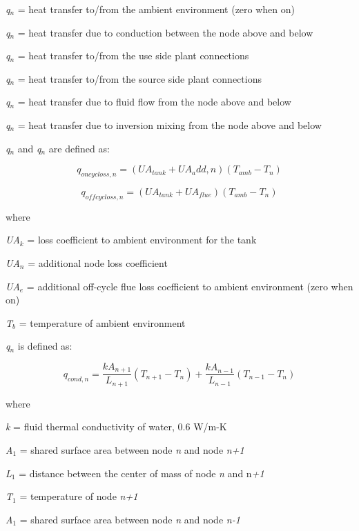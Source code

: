 \emph{q\(_{n}\)} = heat transfer to/from the ambient environment (zero when on)

\emph{q\(_{n}\)} = heat transfer due to conduction between the node above and below

\emph{q\(_{n}\)} = heat transfer to/from the use side plant connections

\emph{q\(_{n}\)} = heat transfer to/from the source side plant connections

\emph{q\(_{n}\)} = heat transfer due to fluid flow from the node above and below

\emph{q\(_{n}\)} = heat transfer due to inversion mixing from the node above and below

\emph{q\(_{n}\)} and \emph{q\(_{n}\)} are defined as:

\begin{equation}
{q_{oncycloss,n}} = ({UA_{tank}} + UA_add,n)({T_{amb}} - {T_n})
\end{equation}

\begin{equation}
{q_{offcycloss,n}} = ({UA_{tank} + UA_{flue}})({T_{amb}} - {T_n})
\end{equation}

where

\emph{UA\(_{k}\)} = loss coefficient to ambient environment for the tank

\emph{UA\(_{n}\)} = additional node loss coefficient

\emph{UA\(_{e}\)} = additional off-cycle flue loss coefficient to ambient environment (zero when on)

\emph{T\(_{b}\)} = temperature of ambient environment

\emph{q\(_{n}\)} is defined as:

\begin{equation}
{q_{cond,n}} = \frac{{k{A_{n + 1}}}}{{{L_{n + 1}}}}({T_{n + 1}} - {T_n}) + \frac{{k{A_{n - 1}}}}{{{L_{n - 1}}}}({T_{n - 1}} - {T_n})
\end{equation}

where

\emph{k} = fluid thermal conductivity of water, 0.6 W/m-K

\emph{A\(_{1}\)} = shared surface area between node \emph{n} and node \emph{n+1}

\emph{L\(_{1}\)} = distance between the center of mass of node \emph{n} and n\emph{+1}

\emph{T\(_{1}\)} = temperature of node \emph{n+1}

\emph{A\(_{1}\)} = shared surface area between node \emph{n} and node \emph{n-1}

